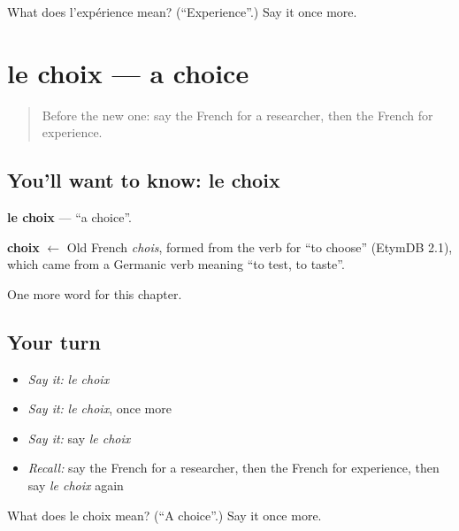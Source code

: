 \begin{tcolorbox}[breakable,colback=teal!4,colframe=teal!35!black,title={Before you move on}]
What does l'expérience mean? (\textquotedblleft{}Experience\textquotedblright{}.) Say it once more.
\end{tcolorbox}
\section[le choix]{le choix — a choice}

\label{lesson:FR-C225-choix}



\begin{quote}
Before the new one: say the French for a researcher, then the French for experience.
\end{quote}

\subsection*{You'll want to know: le choix}
\textbf{le choix} — \textquotedblleft{}a choice\textquotedblright{}.

\begin{cousinweb}
\textbf{choix} $\leftarrow$ Old French \emph{chois}, formed from the verb for \textquotedblleft{}to choose\textquotedblright{} (EtymDB 2.1), which came from a Germanic verb meaning \textquotedblleft{}to test, to taste\textquotedblright{}.
\end{cousinweb}

\begin{grammarlens}[title={What you've built}]
One more word for this chapter.
\end{grammarlens}

\subsection*{Your turn}
\begin{itemize}
\raggedright
  \item \emph{Say it:} \emph{le choix}
  \item \emph{Say it:} \emph{le choix}, once more
  \item \emph{Say it:} say \emph{le choix}
  \item \emph{Recall:} say the French for a researcher, then the French for experience, then say \emph{le choix} again
\end{itemize}

\begin{tcolorbox}[breakable,colback=teal!4,colframe=teal!35!black,title={Before you move on}]
What does le choix mean? (\textquotedblleft{}A choice\textquotedblright{}.) Say it once more.
\end{tcolorbox}

